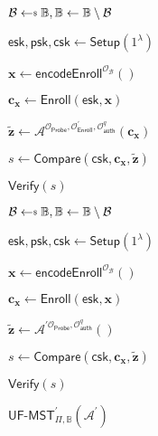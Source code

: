 \begin{figure}[h]
\centering
\vspace*{-\multicolsep}
\begin{multicols}{2}

	\begin{minipage}[t]{0.9\linewidth}
	\begin{algorithm}[H]
	\caption{${\textsf{UF-MST}}_{\Pi, \mathbb{B}}(\mathcal{A})$}
	\label{alg:uf-mst_game}
	\begin{algorithmic}[1]
		\State $\mathcal{B} \getsdollar \mathbb{B}, \mathbb{B} \gets \mathbb{B} \setminus \mathcal{B}$

		\State $\textsf{esk}, \textsf{psk}, \textsf{csk} \gets \textsf{Setup}(1^\lambda)$

		\State $\mathbf{x} \gets \textsf{encodeEnroll}^{\mathcal{O}_{\mathcal{B}}}()$

		\State $\mathbf{c_x} \gets \textsf{Enroll}(\textsf{esk}, \mathbf{x})$

		\State ${\mathbf{\tilde{z}}} \gets \mathcal{A}^{ \mathcal{O}_\textsf{Probe}, \mathcal{O}_\textsf{Enroll}^\prime, \mathcal{O}_\textsf{auth}^q } ( \mathbf{c_x} )$

		\State $s \gets \textsf{Compare}( \textsf{csk}, \mathbf{c_x}, \mathbf{\tilde{z}} )$

		\State \Return $\textsf{Verify}(s)$
	\end{algorithmic}
	\end{algorithm}
	\end{minipage}

	\begin{minipage}[t]{0.9\linewidth}
	\begin{algorithm}[H]
	\caption{${\textsf{UF-MST}}^\prime_{\Pi, \mathbb{B}}(\mathcal{A}^\prime)$}
	\label{alg:uf-mst-prime_game}
	\begin{algorithmic}[1]
		\State $\mathcal{B} \getsdollar \mathbb{B}, \mathbb{B} \gets \mathbb{B} \setminus \mathcal{B}$

		\State $\textsf{esk}, \textsf{psk}, \textsf{csk} \gets \textsf{Setup}(1^\lambda)$

		\State $\mathbf{x} \gets \textsf{encodeEnroll}^{\mathcal{O}_{\mathcal{B}}}()$

		\State $\mathbf{c_x} \gets \textsf{Enroll}(\textsf{esk}, \mathbf{x})$

		\State ${\mathbf{\tilde{z}}} \gets \mathcal{A}^{\prime \mathcal{O}_\textsf{Probe}, \mathcal{O}_\textsf{auth}^q}()$

		\State $s \gets \textsf{Compare}( \textsf{csk}, \mathbf{c_x}, \mathbf{\tilde{z}} )$

		\State \Return $\textsf{Verify}(s)$
	\end{algorithmic}
	\end{algorithm}
	\end{minipage}

\end{multicols}
\label{fig:uf-mst_game}
\end{figure}

